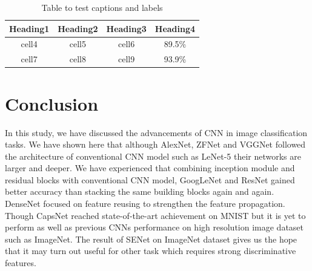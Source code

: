 \documentclass[conference]{IEEEtran}
\begin{document}
\begin{table}
\centering
\caption{Table to test captions and labels}
\label{table:1}
	\begin{tabular}{ |c|c|c|c| } 
		\hline
		 Heading1 &  Heading2 &  Heading3 & Heading4\\ \hline
		cell4 & cell5 & cell6&89.5\% \\ 
		cell7 & cell8 & cell9&93.9\% \\ 
		\hline
	\end{tabular}

\end{table}

\section{Conclusion}
In this study, we have discussed the advancements of CNN in image classification tasks. We have shown here that although AlexNet\cite{Alex2012}, ZFNet\cite{Zeiler2014} and VGGNet followed the architecture of conventional CNN model such as LeNet-5 their networks are larger and deeper. We have experienced that combining inception module and residual blocks with conventional CNN model, GoogLeNet and ResNet gained better accuracy than stacking the same building blocks again and again. DenseNet focused on feature reusing to strengthen the feature propagation. Though CapsNet reached state-of-the-art achievement on MNIST but it is yet to perform as well as previous CNNs performance on high resolution image dataset such as ImageNet. %
The result of SENet on ImageNet dataset gives us the hope that it may turn out useful for other task which requires strong discriminative features.





\end{document}

